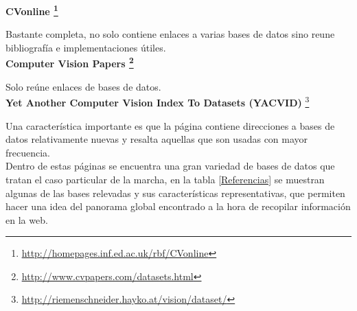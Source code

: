 \hspace{-0.7cm} \textbf{CVonline \footnote{\textcolor{blue}{\underline{\url{http://homepages.inf.ed.ac.uk/rbf/CVonline}}}} } 

Bastante completa, no solo contiene enlaces a  varias bases de datos sino reune bibliografía e implementaciones útiles.\\


\hspace{-0.7cm} \textbf{Computer Vision Papers \footnote{\textcolor{blue}{\underline{\url{ http://www.cvpapers.com/datasets.html}}}} } 

	 Solo reúne enlaces de bases de datos.\\
		

\hspace{-0.7cm} \textbf{Yet Another Computer Vision Index To Datasets (YACVID)} \footnote{\textcolor{blue}{\underline{\url{http://riemenschneider.hayko.at/vision/dataset/}}} } 	

Una característica importante es que la página contiene direcciones a bases de datos relativamente nuevas y resalta aquellas que son usadas con mayor frecuencia. \\
	

Dentro de estas páginas se encuentra una gran variedad de bases de datos que tratan el caso particular de la marcha, en la tabla \ref{Referencias} se muestran algunas de las bases relevadas y sus características representativas, que permiten hacer una idea del panorama global encontrado a la hora de recopilar información en la web.  

